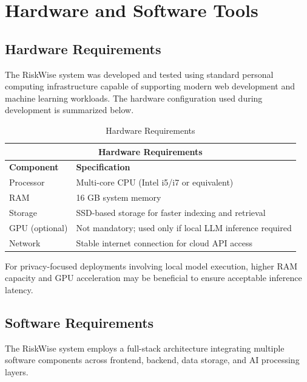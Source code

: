 
\chapter{Hardware and Software Tools} %
\label{AppendixB}

\section{Hardware Requirements}

The RiskWise system was developed and tested using standard personal computing infrastructure capable of supporting modern web development and machine learning workloads. The hardware configuration used during development is summarized below.

\begin{table}[h]
  \centering
  \caption{Hardware Requirements}
  \begin{tabular}{|p{4cm}|p{8cm}|}
    \hline
    \multicolumn{2}{|c|}{\textbf{Hardware Requirements}} \\
    \hline
    \textbf{Component} & \textbf{Specification} \\
    \hline
    Processor & Multi-core CPU (Intel i5/i7 or equivalent) \\
    RAM & 16 GB system memory \\
    Storage & SSD-based storage for faster indexing and retrieval \\
    GPU (optional) & Not mandatory; used only if local LLM inference required \\
    Network & Stable internet connection for cloud API access \\
    \hline
  \end{tabular}
  \label{tab:hardware_requirements}
\end{table}

For privacy-focused deployments involving local model execution, higher RAM capacity and GPU acceleration may be beneficial to ensure acceptable inference latency.

\section{Software Requirements}

The RiskWise system employs a full-stack architecture integrating multiple software components across frontend, backend, data storage, and AI processing layers.

